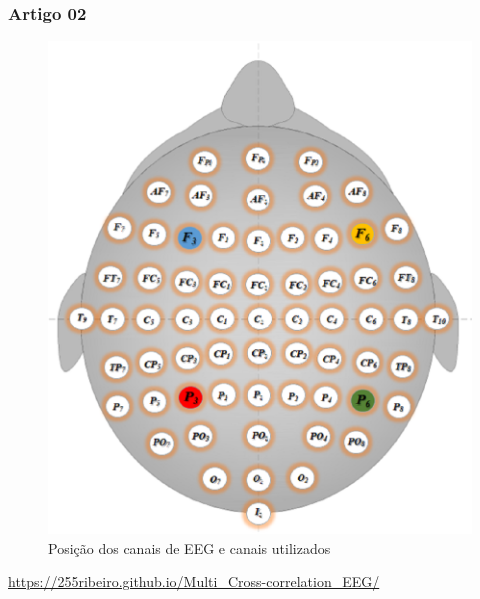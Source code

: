 \documentclass[11pt, aspectratio=169]{beamer}
\begin{document}
\begin{frame}
  \frametitle{Artigo 02}
  \begin{figure}[!h]
    \includegraphics[height=.6\paperheight]{../Figures/art_02/Fig1.png}
    \caption{Posição dos canais de EEG e canais utilizados}
    \label{fig01}
  \end{figure}
 \begin{center}
    \url{https://255ribeiro.github.io/Multi_Cross-correlation_EEG/}
  \end{center}
\end{frame}
\end{document}
